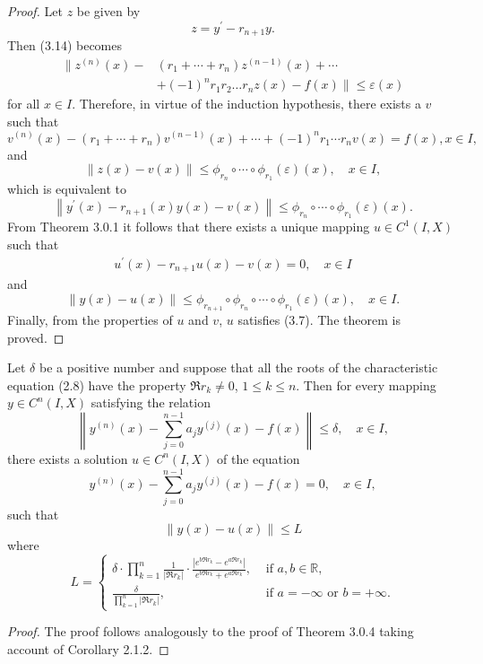 \documentclass[a4paper,12pt]{report}
\begin{document}
\begin{thm}
\begin{proof}
Let $z$ be given by
$$ z=y^{\prime}-r_{n+1} y . $$
Then (3.14) becomes
$$
\begin{aligned}
	\|z^{(n)}(x)-&
	\left(r_1+\cdots+r_{n}\right)
	z^{(n-1)}(x)+\cdots\\
	&+(-1)^{n}r_1r_2 \dots
	r_{n}z(x)-f(x) \| \le
	\varepsilon(x)
\end{aligned}
$$
for all $x \in I$. Therefore, in virtue of the induction hypothesis, there exists a $v$ such that
$$
v^{(n)}(x)-\left(r_{1}+\cdots+r_{n}\right) v^{(n-1)}(x)+\cdots+(-1)^{n} r_{1} \cdots r_{n} v(x)=f(x),  x \in I,
$$
and
$$
\|z(x)-v(x)\| \le \phi_{r_{n}} \circ \cdots \circ \phi_{r_{1}}(\varepsilon)(x), \quad x \in I,
$$
which is equivalent to
$$
\left\|y^{\prime}(x)-r_{n+1}(x) y(x)-v(x)\right\| \le \phi_{r_{n}} \circ \cdots \circ \phi_{r_{1}}(\varepsilon)(x) .
$$
From Theorem 3.0.1 it follows that there exists a unique mapping $u \in C^{1}(I, X)$ such that
\begin{eqnarray}
	u^{\prime}(x)-r_{n+1} u(x)-v(x)=0, \quad x \in I
\end{eqnarray}
and
$$
\|y(x)-u(x)\| \le \phi_{r_{n+1}} \circ \phi_{r_{n}} \circ \cdots \circ \phi_{r_{1}}(\varepsilon)(x), \quad x \in I .
$$
Finally, from the properties of $u$ and $v$, \hspace{0.1cm} $u$ satisfies (3.7). The theorem is proved.
\end{proof}
\end{thm}
\begin{thm}
	Let $\delta$ be a positive number and suppose that all the roots of the characteristic equation (2.8) have the property $\Re r_{k} \neq 0$, $1 \leqslant k \leqslant n$. Then for every mapping $y \in C^{n}(I, X)$ satisfying the relation
	$$
	\left\|y^{(n)}(x)-\sum_{j=0}^{n-1} a_{j} y^{(j)}(x)-f(x)\right\| \leqslant \delta, \quad x \in I,
	$$
	there exists a solution $u \in C^{n}(I, X)$ of the equation
	$$
	y^{(n)}(x)-\sum_{j=0}^{n-1} a_{j} y^{(j)}(x)-f(x)=0, \quad x \in I,
	$$
	such that
	$$
	\|y(x)-u(x)\| \leqslant L
	$$
	where
	$$L= \begin{cases}\delta \cdot \prod_{k=1}^{n} \frac{1}{\left|\Re r_{k}\right|} \cdot \frac{\left|e^{b \Re r_{k}}-e^{a \Re r_{k}}\right|}{e^{b \Re r_{k}}+e^{a \Re r_{k}}}, & \text { if } a, b \in \mathbb{R}, \\ \frac{\delta}{\prod_{k=1}^{n}\left|\Re r_{k}\right|}, & \text { if } a=-\infty \text { or } b=+\infty .\end{cases}
	$$
	\begin{proof}
		The proof follows analogously to the proof of Theorem 3.0.4 taking account of Corollary 2.1.2.
	\end{proof}
	\end{thm}
\end{document}

